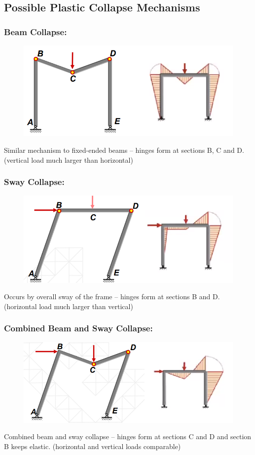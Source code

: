 \documentclass[class=report, crop=false, 12pt,a4paper]{standalone}
\begin{document}
\subsection{Possible Plastic Collapse Mechanisms}
\subsubsection{Beam Collapse:}
\begin{figure}[H]
  \centering
  \includegraphics[width = 0.65 \textwidth]{../img/beam37.PNG}
\end{figure}
Similar mechanism to fixed-ended beams – hinges form at sections B, C and D. (vertical load much larger than horizontal)
\subsubsection{Sway Collapse:}
\begin{figure}[H]
  \centering
  \includegraphics[width = 0.7 \textwidth]{../img/beam38.PNG}
\end{figure}
Occurs by overall sway of the frame – hinges form at sections B and D. (horizontal load much larger than vertical)
\subsubsection{Combined Beam and Sway Collapse:}
\begin{figure}[H]
  \centering
  \includegraphics[width = 0.7 \textwidth]{../img/beam39.PNG}
\end{figure}
Combined beam and sway collapse – hinges form at sections C and D and section B keeps elastic. (horizontal and vertical loads comparable)
\end{document}
